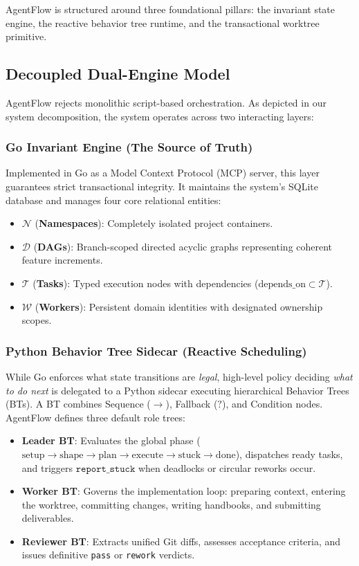 \documentclass[conference]{IEEEtran}
\begin{document}
AgentFlow is structured around three foundational pillars: the invariant state engine, the reactive behavior tree runtime, and the transactional worktree primitive.

\subsection{Decoupled Dual-Engine Model}
AgentFlow rejects monolithic script-based orchestration. As depicted in our system decomposition, the system operates across two interacting layers:

\subsubsection{Go Invariant Engine (The Source of Truth)}
Implemented in Go as a Model Context Protocol (MCP) server, this layer guarantees strict transactional integrity. It maintains the system's SQLite database and manages four core relational entities:
\begin{itemize}
    \item $\mathcal{N}$ (\textbf{Namespaces}): Completely isolated project containers.
    \item $\mathcal{D}$ (\textbf{DAGs}): Branch-scoped directed acyclic graphs representing coherent feature increments.
    \item $\mathcal{T}$ (\textbf{Tasks}): Typed execution nodes with dependencies ($\text{depends\_on} \subset \mathcal{T}$).
    \item $\mathcal{W}$ (\textbf{Workers}): Persistent domain identities with designated ownership scopes.
\end{itemize}

\subsubsection{Python Behavior Tree Sidecar (Reactive Scheduling)}
While Go enforces what state transitions are \textit{legal}, high-level policy deciding \textit{what to do next} is delegated to a Python sidecar executing hierarchical Behavior Trees (BTs). A BT combines Sequence ($\to$), Fallback ($?$), and Condition nodes. AgentFlow defines three default role trees:
\begin{itemize}
    \item \textbf{Leader BT}: Evaluates the global phase ($\text{setup} \to \text{shape} \to \text{plan} \to \text{execute} \to \text{stuck} \to \text{done}$), dispatches ready tasks, and triggers $\texttt{report\_stuck}$ when deadlocks or circular reworks occur.
    \item \textbf{Worker BT}: Governs the implementation loop: preparing context, entering the worktree, committing changes, writing handbooks, and submitting deliverables.
    \item \textbf{Reviewer BT}: Extracts unified Git diffs, assesses acceptance criteria, and issues definitive \texttt{pass} or \texttt{rework} verdicts.
\end{itemize}
\end{document}

